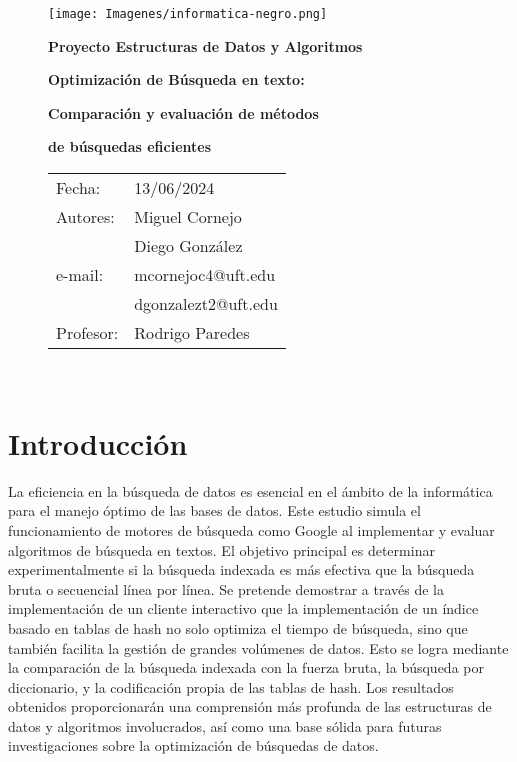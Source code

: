 \documentclass[12pt, twoside]{article}
\begin{document}
\begin{figure}[tbp]
\texttt{[image: Imagenes/informatica-negro.png]}
\vspace{1cm}
\newline
\centerline{\huge \bf Proyecto Estructuras de Datos y Algoritmos}
\vspace{0.8cm}
\newline
\vspace{0.4cm}
\centerline{\Large \bf Optimización de Búsqueda en texto:}
\vspace{0.2cm}
\centerline{\Large \bf Comparación y evaluación de métodos}
\centerline{\Large \bf de búsquedas eficientes}
\vspace{0.5cm}
\newline


\hfill \begin{tabular}{ll}\vspace{0.2cm}
Fecha:  & 13/06/2024\\
Autores:  & Miguel Cornejo\\ \vspace{0.2cm}
& Diego González\\
e-mail: & mcornejoc4@uft.edu\\ \vspace{0.2cm}
& dgonzalezt2@uft.edu\\
Profesor:  &  Rodrigo Paredes
\end{tabular}
\end{figure}
\textcolor{white}{a}
\newpage

\tableofcontents
\newpage


\section{Introducción}
La eficiencia en la búsqueda de datos es esencial en el ámbito de la informática para el manejo óptimo de las bases de datos. Este estudio simula el funcionamiento de motores de búsqueda como Google al implementar y evaluar algoritmos de búsqueda en textos. El objetivo principal es determinar experimentalmente si la búsqueda indexada es más efectiva que la búsqueda bruta o secuencial línea por línea. Se pretende demostrar a través de la implementación de un cliente interactivo que la implementación de un índice basado en tablas de hash no solo optimiza el tiempo de búsqueda, sino que también facilita la gestión de grandes volúmenes de datos. Esto se logra mediante la comparación de la búsqueda indexada con la fuerza bruta, la búsqueda por diccionario, y la codificación propia de las tablas de hash. Los resultados obtenidos proporcionarán una comprensión más profunda de las estructuras de datos y algoritmos involucrados, así como una base sólida para futuras investigaciones sobre la optimización de búsquedas de datos.
\newpage
\end{document}
